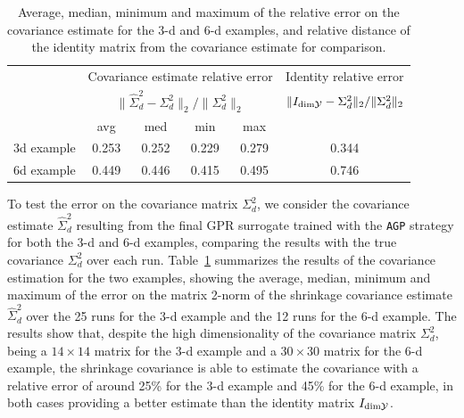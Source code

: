 \begin{table}[H]

    \begin{centering}
        
    
    \hspace*{-1.5cm}
    \begin{tabular}{cccccc}
    \toprule
        & \multicolumn{4}{c}{Covariance estimate relative error}  & Identity relative error \\ 
        & \multicolumn{4}{c}{$ \|\hat \Sigma_d^2 - \Sigma_d^2\|_2 / \|\Sigma_d^2\|_2 $}  & $ \|I_{\text{dim} \mathcal Y} - \Sigma_d^2\|_2 / \|\Sigma_d^2\|_2 $ \\ 
        & avg   & med   & min   & max   &  \\
        \midrule
        3d example
        & 0.253 & 0.252 & 0.229 & 0.279
        & 0.344 \\
        6d example
        & 0.449 & 0.446 & 0.415 & 0.495 
        & 0.746 \\
        
    \bottomrule
    \end{tabular}
    \caption{Average, median, minimum and maximum of the relative error on the covariance estimate for the 3-d and 6-d examples, and relative distance of the identity matrix from the covariance estimate for comparison.
    }
    \label{tab:cov_est_err}
\end{centering}
\end{table}

To test the error on the covariance matrix $\Sigma_d^2$, we consider the covariance estimate $\hat \Sigma_d^2$ resulting from the final GPR surrogate trained with the \texttt{AGP} strategy for both the 3-d and 6-d examples, comparing the results with the true covariance $\Sigma_d^2$ over each run.
Table~\ref{tab:cov_est_err} summarizes the results of the covariance estimation for the two examples, showing the average, median, minimum and maximum of the error on the matrix 2-norm of the shrinkage covariance estimate $\hat \Sigma_d^2$ over the 25 runs for the 3-d example and the 12 runs for the 6-d example. \newline
The results show that, despite the high dimensionality of the covariance matrix $\Sigma_d^2$, being a $14\times 14$ matrix for the 3-d example and a $30 \times 30$ matrix for the 6-d example, the shrinkage covariance is able to estimate the covariance with a relative error of around 25\% for the 3-d example and 45\% for the 6-d example, in both cases providing a better estimate than the identity matrix $I_{\text{dim} \mathcal Y}$. \medskip

